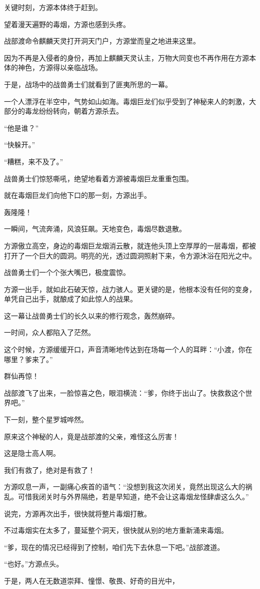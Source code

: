 \begin{this_body}
关键时刻，方源本体终于赶到。

望着漫天遍野的毒烟，方源也感到头疼。

战部渡命令麒麟天灵打开洞天门户，方源堂而皇之地进来这里。

因为不再是入侵者的身份，再加上麒麟天灵认主，万物大同变也不再作用在方源本体的神色，方源得以亲临战场。

于是，战场中的战兽勇士们就看到了匪夷所思的一幕。

一个人漂浮在半空中，气势如山如海。毒烟巨龙们似乎受到了神秘来人的刺激，大部分的毒龙纷纷转向，朝着方源杀去。

“他是谁？”

“快躲开。”

“糟糕，来不及了。”

战兽勇士们惊怒嘶吼，绝望地看着方源被毒烟巨龙重重包围。

就在毒烟巨龙们向他下口的那一刻，方源出手。

轰隆隆！

一瞬间，气流奔涌，风浪狂飙。天地变色，毒烟尽数退散。

方源傲立高空，身边的毒烟巨龙烟消云散，就连他头顶上空厚厚的一层毒烟，都被打开了一个巨大的圆洞。明亮的光，透过圆洞照射下来，令方源沐浴在阳光之中。

战兽勇士们一个个张大嘴巴，极度震惊。

方源一出手，就如此石破天惊，战力骇人。更关键的是，他根本没有任何的变身，单凭自己出手，就酿成了如此惊人的战果。

这一幕让战兽勇士们的长久以来的修行观念，轰然崩碎。

一时间，众人都陷入了茫然。

这个时候，方源缓缓开口，声音清晰地传达到在场每一个人的耳畔：“小渡，你在哪里？爹来了。”

群仙再惊！

战部渡飞了出来，一脸惊喜之色，眼泪横流：“爹，你终于出山了。快救救这个世界吧。”

下一刻，整个星罗城哗然。

原来这个神秘的人，竟是战部渡的父亲，难怪这么厉害！

这是隐士高人啊。

我们有救了，绝对是有救了！

方源叹息一声，一副痛心疾首的语气：“没想到我这次闭关，竟然出现这么大的祸乱。可惜我闭关时与外界隔绝，若是早知道，绝不会让这毒烟龙怪肆虐这么久。”

说完，方源再次出手，很快就将整片毒烟打散。

不过毒烟实在太多了，蔓延整个洞天，很快就从别的地方重新涌来毒烟。

“爹，现在的情况已经得到了控制，咱们先下去休息一下吧。”战部渡道。

“也好。”方源点头。

于是，两人在无数道崇拜、憧憬、敬畏、好奇的目光中，

\end{this_body}

